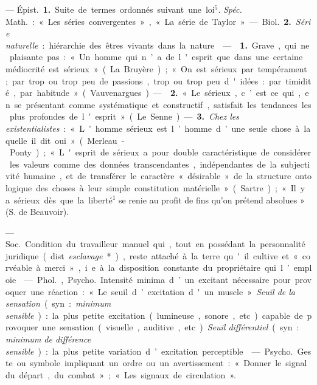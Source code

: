\begin{itemize}[leftmargin=1cm, label=, itemsep=1pt]
 — \si{Épist.} {\bf 1.} Suite de termes ordonnés suivant une
loi$^5$. {\it Spéc.} \si{Math.} : « Les séries convergentes », « La série de
Taylor ». — \si{Biol.} {\bf 2.} {\it Série naturelle} : hiérarchie des êtres
vivants dans la nature.

 —  {\bf 1.} Grave, qui ne plaisante pas : « Un
homme qui n’a de l'esprit que dans une certaine médiocrité est sérieux » (La
Bruyère) ; « On est sérieux par tempérament; par trop ou trop peu de
passions, trop ou trop peu d'idées : par timidité, par
habitude » (Vauvenargues). —  {\bf 2.} « Le sérieux, c’est ce
qui, en se présentant comme systématique et constructif, satisfait les
tendances les plus profondes de l'esprit » (Le Senne).

— {\bf 3.} {\it Chez les existentialistes} : « L'homme sérieux est l’homme
d’une seule chose à laquelle il dit oui » (Merleau-Ponty) ; « L'esprit de
sérieux a pour double caractéristique de considérer les valeurs comme des
données transcendantes, indépendantes de la subjectivité humaine, et de
transférer le caractère « désirable » de la structure ontologique des choses
à leur simple constitution matérielle » (Sartre) ; « Il y a sérieux dès que
la liberté$^1$ se renie au profit de fins qu'on prétend absolues » (S. de
Beauvoir).

 — \si{Soc.} Condition du travailleur manuel qui, tout en
possédant la personnalité juridique (dist. {\it esclavage}*), reste attaché à
la terre qu'il cultive et « corvéable à merci », i.e. à la disposition
constante du propriétaire qui l’emploie.

 — \si{Phol.}, \si{Psycho.} Intensité minima d’un excitant
nécessaire pour provoquer une réaction : « Le seuil d’excitation d'un
muscle ». {\it Seuil de la sensation} (syn. : {\it minimum sensible}) : la
plus petite excitation (lumineuse, sonore, etc.) capable de provoquer une
sensation (visuelle, auditive, etc). {\it Seuil différentiel} (syn. : {\it
minimum de différence sensible}) :
la plus petite variation d’excitation perceptible.

 — \si{Psycho.} Geste ou symbole impliquant un ordre ou un
avertissement : « Donner le signal du départ, du combat »; « Les signaux de
circulation ».


\end{itemize}
